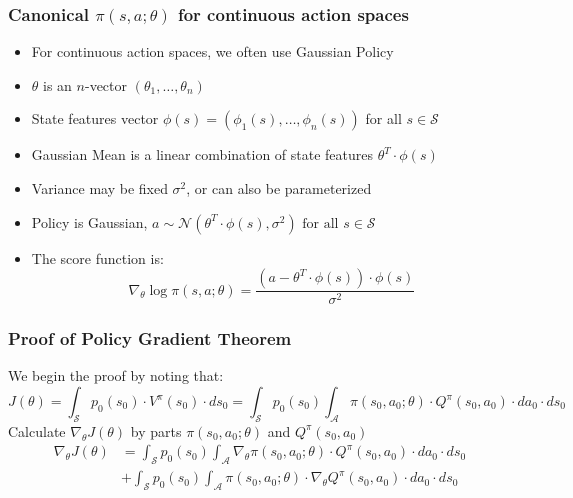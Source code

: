 \documentclass[handout]{beamer}
\begin{document}
\begin{frame}
\frametitle{Canonical $\pi(s,a;\theta)$ for continuous action spaces}
\pause
\begin{itemize}[<+->]
\item For continuous action spaces, we often use Gaussian Policy
\item $\theta$ is an $n$-vector $(\theta_1, \ldots, \theta_n)$
\item State features vector $\phi(s) = (\phi_1(s), \ldots, \phi_n(s))$ for all $s \in \mathcal{S}$
\item Gaussian Mean is a linear combination of state features $\theta^T \cdot \phi(s)$
\item Variance may be fixed $\sigma^2$, or can also be parameterized
\item Policy is Gaussian, $a \sim \mathcal{N}(\theta^T \cdot \phi(s), \sigma^2) \mbox{ for all } s \in \mathcal{S}$
\item The score function is:
$$\nabla_{\theta} \log \pi(s,a;\theta) = \frac {(a - \theta^T \cdot \phi(s)) \cdot \phi(s)} {\sigma^2}$$
\end{itemize}
\end{frame}

\begin{frame}
\frametitle{Proof of Policy Gradient Theorem}
\pause
We begin the proof by noting that:
$$J(\theta) = \int_{\mathcal{S}} p_0(s_0) \cdot V^{\pi}(s_0) \cdot ds_0 = \int_{\mathcal{S}} p_0(s_0) \int_{\mathcal{A}} \pi(s_0, a_0; \theta) \cdot Q^{\pi}(s_0, a_0) \cdot da_0 \cdot ds_0$$
\pause
Calculate $\nabla_{\theta} J(\theta)$ by parts $\pi(s_0, a_0; \theta)$ and $Q^{\pi}(s_0, a_0)$
\pause
\begin{align*}
\nabla_{\theta} J(\theta) & = \int_{\mathcal{S}} p_0(s_0) \int_{\mathcal{A}} \nabla_{\theta} \pi(s_0, a_0; \theta) \cdot Q^{\pi}(s_0, a_0) \cdot da_0 \cdot ds_0 \\
& + \int_{\mathcal{S}} p_0(s_0) \int_{\mathcal{A}} \pi(s_0, a_0; \theta) \cdot \nabla_{\theta} Q^{\pi}(s_0, a_0) \cdot da_0 \cdot ds_0  \\
\end{align*}
\end{frame}
\end{document}
